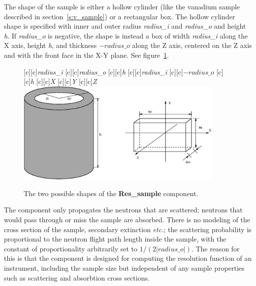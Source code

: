 The shape of the sample is either a hollow cylinder (like the vanadium
sample described in section~\ref{s:v_sample}) or a rectangular box. The
hollow cylinder shape is specified with inner and outer radius \textit{radius\_i}
and \textit{radius\_o} and height \textit{h}. If \textit{radius\_o} is
negative, the shape is instead a box of width \textit{radius\_i} along
the X axis, height \textit{h}, and thickness $-\textit{radius\_o}$ along the
Z axis, centered on the Z axis and with the front face in the X-Y
plane. See figure~\ref{f:res_sample}.\par
%
\begin{figure}[htbp]
  \begin{center}
        [c][c]{\textit{radius\_i}}
        [c][c]{\textit{radius\_o}}
        [c][c]{\textit{h}}
        [c][c]{\textit{radius\_i}}
        [c][c]{$-\textit{radius\_o}$}
        [c][c]{\textit{h}}
        [c][c]{\textit{X}}
        [c][c]{\textit{Y}}
        [c][c]{\textit{Z}}
        \includegraphics[width=0.9\textwidth]{figures/res_sample.eps}
    \caption{The two possible shapes of the \textbf{Res\_sample} component.}
    \label{f:res_sample}
  \end{center}
\end{figure}
%
The component only propagates the neutrons that are scattered; neutrons
that would pass through or miss the sample are absorbed. There is no
modeling of the cross section of the sample, secondary extinction
\textit{etc.}; the scattering probability is proportional to the neutron
flight path length inside the sample, with the constant of
proportionality arbitrarily set to $1/(2|\textit{radius\_o}|)$. The
reason for this is that the component is designed for computing the resolution
function of an instrument, including the sample size but independent of
any sample properties such as scattering and absorbtion cross sections.

